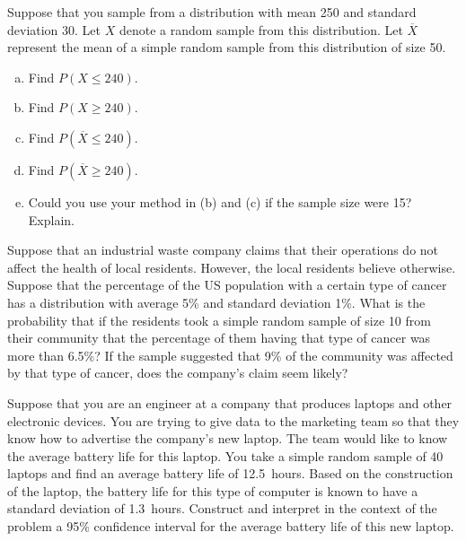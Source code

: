 \documentclass[11pt,letterpaper]{article}
\begin{document}

 Suppose that you sample from a distribution with mean 250 and standard deviation 30. Let $X$ denote a random sample from this distribution. Let $\overline{X}$ represent the mean of a simple random sample from this distribution of size 50.
	\begin{enumerate}[(a)]
	\item Find $P(X \leq 240)$.
	\item Find $P(X \geq 240)$.
	\item Find $P(\overline{X} \leq 240)$.
	\item Find $P(\overline{X} \geq 240)$.
	\item Could you use your method in (b) and (c) if the sample size were 15? Explain. 
	\end{enumerate}



\newpage



 Suppose that an industrial waste company claims that their operations do not affect the health of local residents. However, the local residents believe otherwise. Suppose that the percentage of the US population with a certain type of cancer has a distribution with average 5\% and standard deviation 1\%. What is the probability that if the residents took a simple random sample of size 10 from their community that the percentage of them having that type of cancer was more than 6.5\%? If the sample suggested that 9\% of the community was affected by that type of cancer, does the company's claim seem likely? 



\newpage



 Suppose that you are an engineer at a company that produces laptops and other electronic devices. You are trying to give data to the marketing team so that they know how to advertise the company's new laptop. The team would like to know the average battery life for this laptop. You take a simple random sample of 40 laptops and find an average battery life of 12.5~hours. Based on the construction of the laptop, the battery life for this type of computer is known to have a standard deviation of 1.3~hours. Construct and interpret in the context of the problem a 95\% confidence interval for the average battery life of this new laptop. 
\end{document}
